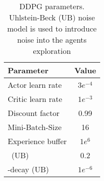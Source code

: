 

{\def\arraystretch{1.4}\tabcolsep=5pt
\begin{table}
	\centering
	\begin{tabular}{| l | c |}
		\hline
		\textbf{Parameter} & \textbf{Value}\\
		\hline
		\hline
		Actor learn rate & $3e^{-4}$ \\
		Critic learn rate & $1e^{-3}$ \\
		Discount factor &  0.99 \\
		Mini-Batch-Size & 16 \\
		Experience buffer & $1e^6$\\
		\textsigma \ (UB) & 0.2 \\
		\textsigma-decay (UB) & $1e^{-6}$ \\
		
		\hline
	\end{tabular}
	\caption[DDPG parameters]{DDPG parameters. Uhlstein-Beck (UB) noise model is used to introduce noise into the agents exploration}
	\label{table: DDPG parameters}
\end{table}
}


